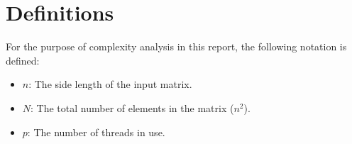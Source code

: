 \section{Definitions}

For the purpose of complexity analysis in this report, the following notation is defined:

\begin{itemize}
    \item $n$: The side length of the input matrix.
    \item $N$: The total number of elements in the matrix ($n^2$).
    \item $p$: The number of threads in use.
\end{itemize}